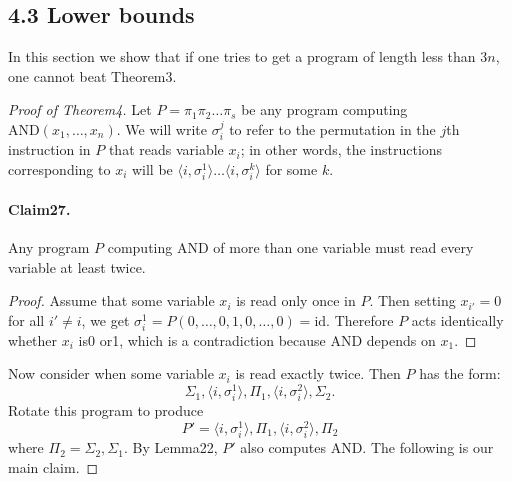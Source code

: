 \subsection*{4.3 Lower bounds}
In this section we show that if one tries to get a program of length less than $3n$, one cannot beat Theorem3.
\begin{proof}[Proof of Theorem4]
Let $P=\pi_1\pi_2\ldots\pi_s$ be any program computing $\mathrm{AND}(x_1,\ldots,x_n)$. We will write $\sigma_i^j$ to refer to the permutation in the $j$th instruction in $P$ that reads variable $x_i$; in other words, the instructions corresponding to $x_i$ will be $\langle i,\sigma_i^1\rangle\ldots\langle i,\sigma_i^k\rangle$ for some $k$.
\paragraph{Claim27.} Any program $P$ computing AND of more than one variable must read every variable at least twice.
\begin{proof}
Assume that some variable $x_i$ is read only once in $P$. Then setting $x_{i'}=0$ for all $i'\neq i$, we get $\sigma_i^1=P(0,\ldots,0,1,0,\ldots,0)=\mathrm{id}$. Therefore $P$ acts identically whether $x_i$ is0 or1, which is a contradiction because AND depends on $x_1$.
\end{proof}
Now consider when some variable $x_i$ is read exactly twice. Then $P$ has the form:
\[\Sigma_1,\langle i,\sigma_i^1\rangle,\Pi_1,\langle i,\sigma_i^2\rangle,\Sigma_2.\]
Rotate this program to produce
\[P'=\langle i,\sigma_i^1\rangle,\Pi_1,\langle i,\sigma_i^2\rangle,\Pi_2\]
where $\Pi_2=\Sigma_2,\Sigma_1$. By Lemma22, $P'$ also computes AND.
The following is our main claim.

\end{proof}
